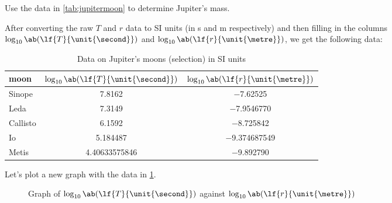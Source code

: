 \begin{problem}
Use the data in \cref{tab:jupitermoon} to determine Jupiter's mass.
\end{problem}

After converting the raw \(T\) and \(r\) data to SI units (in \unit{\second} and \unit{\metre} respectively)
and then filling in the columns \(\log_{10} \ab(\lf{T}{\unit{\second}})\) and \(\log_{10} \ab(\lf{r}{\unit{\metre}})\),
we get the following data:
\begin{table}[htpb]
	\footnotesize
	\begin{tabular}{l c c}
		\toprule
		moon     & \(\log_{10} \ab(\lf{T}{\unit{\second}})\) & \(\log_{10} \ab(\lf{r}{\unit{\metre}})\) \\
		\midrule
		Sinope   & \num{7.8162}                              & \num{-7.62525}                           \\
		Leda     & \num{7.3149}                              & \num{-7.9546770}                         \\
		Callisto & \num{6.1592}                              & \num{-8.725842}                          \\
		Io       & \num{5.184487}                            & \num{-9.374687549}                       \\
		Metis    & \num{4.40633575846}                       & \num{-9.892790}                          \\
		\bottomrule
	\end{tabular}
	\label{tab:jupitermoon_si}
	\caption{Data on Jupiter's moons (selection) in SI units}
\end{table}

Let's plot a new graph with the data in \cref{tab:jupitermoon_si}.
\begin{figure}[htpb]
	\centering
	\label{fig:moons_si}
	\caption{Graph of \(\log_{10} \ab(\lf{T}{\unit{\second}})\) against \(\log_{10} \ab(\lf{r}{\unit{\metre}})\)}
\end{figure}

